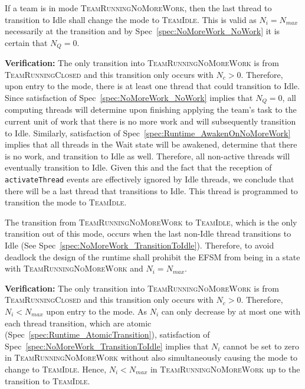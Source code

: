 \documentclass{article}
\newcommand{\TeamIdle}          {\textsc{TeamIdle}}
\newcommand{\TeamRunningClosed} {\textsc{TeamRunningClosed}}
\newcommand{\TeamRunningNoMoreWork} {\textsc{TeamRunningNoMoreWork}}
\begin{document}
\begin{spec}
\label{spec:NoMoreWork_TransitionToIdle}
If a team is in mode \TeamRunningNoMoreWork, then the last thread to transition
to Idle shall change the mode to \TeamIdle.  This is valid as $N_i =
N_{max}$ necessarily at the transition and by Spec~\ref{spec:NoMoreWork_NoWork}
it is certain that $N_Q = 0$.
\end{spec}
\textbf{Verification:}\hspace{0.125in}  The only transition into
{\TeamRunningNoMoreWork} is from {\TeamRunningClosed} and this transition only
occurs with $N_c > 0$.  Therefore, upon entry to the mode, there is at least one
thread that could transition to Idle.  Since satisfaction of
Spec~\ref{spec:NoMoreWork_NoWork} implies that $N_Q = 0$, all computing threads
will determine upon finishing applying the team's task to the current unit of
work that there is no more work and will subsequently transition to Idle.
Similarly, satisfaction of Spec~\ref{spec:Runtime_AwakenOnNoMoreWork} implies
that all threads in the Wait state will be awakened, determine that there is no
work, and transition to Idle as well.  Therefore, all non-active threads will
eventually transition to Idle.  Given this and the fact that the reception of
\texttt{activateThread} events are effectively ignored by Idle threads, we
conclude that there will be a last thread that transitions to Idle.   This
thread is programmed to transition the mode to \TeamIdle.

\begin{spec}
\label{spec:NoMoreWork_NeedThread}
The transition from {\TeamRunningNoMoreWork} to \TeamIdle, which is the only
transition out of this mode, occurs when the last non-Idle thread transitions to
Idle (See Spec~\ref{spec:NoMoreWork_TransitionToIdle}).  Therefore, to avoid deadlock the design of the runtime
shall prohibit the EFSM from being in a state with {\TeamRunningNoMoreWork} and
$N_i = N_{max}$.
\end{spec}
\textbf{Verification:}\hspace{0.125in}  The only transition into
{\TeamRunningNoMoreWork} is from {\TeamRunningClosed} and this transition only
occurs with $N_c > 0$.  Therefore, $N_i < N_{max}$ upon entry to
the mode.  As $N_i$ can only decrease by at most one with each thread
transition, which are atomic (Spec~\ref{spec:Runtime_AtomicTransition}),
satisfaction of Spec~\ref{spec:NoMoreWork_TransitionToIdle} implies that $N_i$
cannot be set to zero in {\TeamRunningNoMoreWork} without also simultaneously
causing the mode to change to \TeamIdle.  Hence, $N_i < N_{max}$ in
{\TeamRunningNoMoreWork} up to the transition to \TeamIdle.
\end{document}
